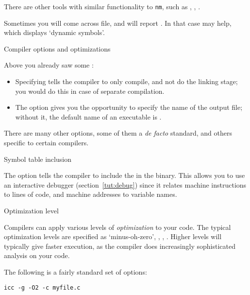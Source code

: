 
\begin{remark}
  There are other tools with similar functionality to \lstinline{nm},
  such as , , .  
\end{remark}

\begin{remark}
  Sometimes you will come across  file,
  and  will report .
  In that case  may help, which displays `dynamic symbols'.
\end{remark}

 {Compiler options and optimizations}

Above you already saw some :
\begin{itemize}
\item Specifying  tells the compiler to only compile, and not do
  the linking stage; you would do this in case of separate
  compilation.
\item The option  gives you the opportunity to specify the name
  of the output file; without it, the default name of an executable is
  .
\end{itemize}

There are many other options, some of them a \emph{de facto} standard,
and others specific to certain compilers.

 {Symbol table inclusion}

The  option tells the compiler to include the  in the binary.  This allows you to use an interactive
debugger (section~\ref{tut:debug}) since it relates machine
instructions to lines of code, and machine addresses to variable
names.

 {Optimization level}

Compilers can apply various levels of
\emph{optimization} to your code. The
typical optimization levels are specified as  `minus-oh-zero',
, , . Higher levels will typically give faster
execution, as the compiler does increasingly sophisticated analysis on
your code.

The following is a fairly standard set of options:
\begin{verbatim}
icc -g -O2 -c myfile.c
\end{verbatim}

